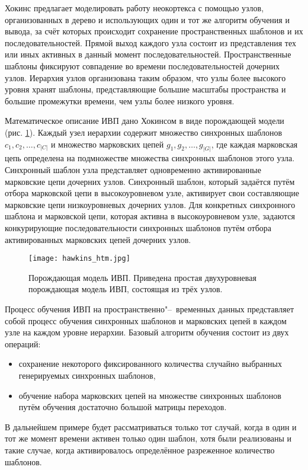 Хокинс предлагает моделировать работу неокортекса с помощью узлов, организованных в дерево и использующих один и тот же алгоритм обучения и вывода, за счёт которых происходит сохранение пространственных шаблонов и их последовательностей. Прямой выход каждого узла состоит из представления тех или иных активных в данный момент последовательностей. Пространственные шаблоны фиксируют совпадение во времени последовательностей дочерних узлов. Иерархия узлов организована таким образом, что узлы более высокого уровня хранят шаблоны, представляющие большие масштабы пространства и большие промежутки времени, чем узлы более низкого уровня.

Математическое описание ИВП дано Хокинсом в виде порождающей модели (рис. \ref{fg:hawkins_htm}). Каждый узел иерархии содержит множество синхронных шаблонов $c_1, c_2,\dots,c_{|C|}$ и множество марковских цепей $g_1,g_2,\dots,g_{|G|}$, где каждая марковская цепь определена на подмножестве множества синхронных шаблонов этого узла. Синхронный шаблон узла представляет одновременно активированные марковские цепи дочерних узлов. Синхронный шаблон, который задаётся путём отбора марковской цепи в высокоуровневом узле, активирует свои составляющие марковские цепи низкоуровневых дочерних узлов. Для конкретных синхронного шаблона и марковской цепи, которая активна в высокоуровневом узле, задаются конкурирующие последовательности синхронных шаблонов путём отбора активированных марковских цепей дочерних узлов.

\begin{figure}[h]
	\centering
	\texttt{[image: hawkins\_htm.jpg]}
	\caption{Порождающая модель ИВП. Приведена простая двухуровневая порождающая модель ИВП, состоящая из трёх узлов.}
	\label{fg:hawkins_htm}
\end{figure}

Процесс обучения ИВП на пространственно"--~временных данных представляет собой процесс обучения синхронных шаблонов и марковских цепей в каждом узле на каждом уровне иерархии. Базовый алгоритм обучения состоит из двух операций:
\begin{itemize}
	\item сохранение некоторого фиксированного количества случайно выбранных генерируемых синхронных шаблонов,
	\item обучение набора марковских цепей на множестве синхронных шаблонов путём обучения достаточно большой матрицы переходов.
\end{itemize}
В дальнейшем примере будет рассматриваться только тот случай, когда в один и тот же момент времени активен только один шаблон, хотя были реализованы и такие случае, когда активировалось определённое разреженное количество шаблонов.

